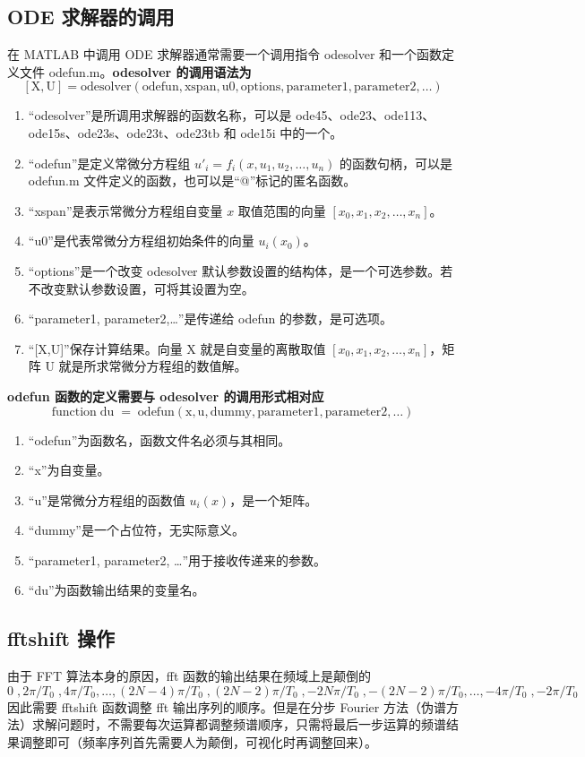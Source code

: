 \subsection*{ODE 求解器的调用}
在 MATLAB 中调用 ODE 求解器通常需要一个调用指令 odesolver 和一个函数定义文件 odefun.m。{\bfseries odesolver 的调用语法为}
$$
\mathrm{[X,U]=odesolver(odefun, xspan, u0, options, parameter1, parameter2, \ldots)}
$$
\begin{enumerate}[label=(\arabic*)]
  \item “odesolver”是所调用求解器的函数名称，可以是 ode45、ode23、ode113、ode15s、ode23s、ode23t、ode23tb 和 ode15i 中的一个。
  \item “odefun”是定义常微分方程组 $u'_i=f_i(x,u_1,u_2,\ldots,u_n)$ 的函数句柄，可以是 odefun.m 文件定义的函数，也可以是“@”标记的匿名函数。
  \item “xspan”是表示常微分方程组自变量 $x$ 取值范围的向量 $[x_0,x_1,x_2,\ldots,x_n]$。
  \item “u0”是代表常微分方程组初始条件的向量 $u_i(x_0)$。
  \item “options”是一个改变 odesolver 默认参数设置的结构体，是一个可选参数。若不改变默认参数设置，可将其设置为空。
  \item “parameter1, parameter2,\ldots”是传递给 odefun 的参数，是可选项。
  \item “[X,U]”保存计算结果。向量 X 就是自变量的离散取值 $[x_0,x_1,x_2,\ldots,x_n]$，矩阵 U 就是所求常微分方程组的数值解。
\end{enumerate}

{\bfseries odefun 函数的定义需要与 odesolver 的调用形式相对应}
$$
\mathrm{function\; du\; =\; odefun(x, u, dummy,  parameter1, parameter2, \ldots)}
$$
\begin{enumerate}[label=(\arabic*)]
  \item “odefun”为函数名，函数文件名必须与其相同。
  \item “x”为自变量。
  \item “u”是常微分方程组的函数值 $u_i(x)$，是一个矩阵。
  \item “dummy”是一个占位符，无实际意义。
  \item “parameter1, parameter2, \ldots”用于接收传递来的参数。
  \item “du”为函数输出结果的变量名。
\end{enumerate}

\subsection*{fftshift 操作}
由于 FFT 算法本身的原因，fft 函数的输出结果在频域上是颠倒的
$$
0\;,2\pi/T_0\;,4\pi/T_0,\ldots,(2N-4)\pi/T_0\;,(2N-2)\pi/T_0\;,-2N\pi/T_0\;,-(2N-2)\pi/T_0,\ldots,-4\pi/T_0\;,-2\pi/T_0
$$
因此需要 fftshift 函数调整 fft 输出序列的顺序。但是在分步 Fourier 方法（伪谱方法）求解问题时，不需要每次运算都调整频谱顺序，只需将最后一步运算的频谱结果调整即可（频率序列首先需要人为颠倒，可视化时再调整回来）。


